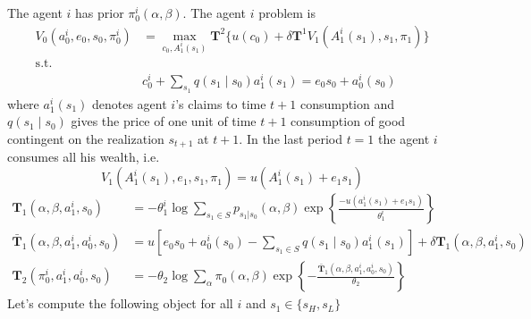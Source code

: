 \documentclass[a4paper,12pt]{article}
\begin{document}
The agent $i$ has prior $\pi^i_0(\alpha,\beta)$. The agent $i$ problem is
\begin{align*}
V_0(a_0^i,e_0,s_0,\pi^i_0) &= \max_{c_0,A_1^i(s_1)} \mathbf{T}^2 \{u(c_0) + \delta\mathbf{T}^1 V_1(A_1^i(s_1), s_1, \pi_1) \} \\
\textrm{s.t.} & \\
              & c_0^i +  \sum_{s_1}{q(s_1\mid s_0) a_1^i(s_1)} = e_0 s_0 + a^i_0(s_0) 
\end{align*}
where $a_1^i(s_1)$ denotes agent $i$'s claims to time $t+1$ consumption and $q(s_1\mid s_0)$ gives the price of one unit of time $t+1$ consumption of good contingent on the realization $s_{t+1}$ at $t+1$.
In the last period $t=1$ the agent $i$ consumes all his wealth, i.e.
\[
V_1(A_1^i(s_1), e_1, s_1, \pi_1) = u(A_1^i(s_1) + e_1 s_1)
\]
\begin{align*}
\mathbf{T}_1(\alpha, \beta, a_1^i, s_0)    &= -\theta_1^i \log \sum_{s_1 \in S}{p_{s_1|s_0}(\alpha,\beta) \exp\left\{{\frac{-u(a_1^i(s_1) + e_1 s_1)}{\theta_1^i}}\right\}} \\
\bar{\mathbf{T}}_1(\alpha, \beta, a_1^i, a_0^i, s_0)&= u\left[ e_0 s_0 + a_0^i (s_0) - \sum_{s_1 \in S}{q(s_1\mid s_0) a_1^i(s_1)}\right] + \delta \mathbf{T}_1(\alpha,\beta, a_1^i,s_0) \\
\mathbf{T}_2(\pi_0^i, a_1^i, a_0^i, s_0)   &=-\theta_2 \log \sum_{\alpha}{\pi_0(\alpha,\beta)\exp\left \{ -\frac{\bar{\mathbf{T}}_1(\alpha, \beta, a_1^i,a_0^i, s_0)}{\theta_2} \right\}}
\end{align*}
Let's compute the following object for all $i$ and $s_1 \in \{s_H,s_L\}$
\end{document}
